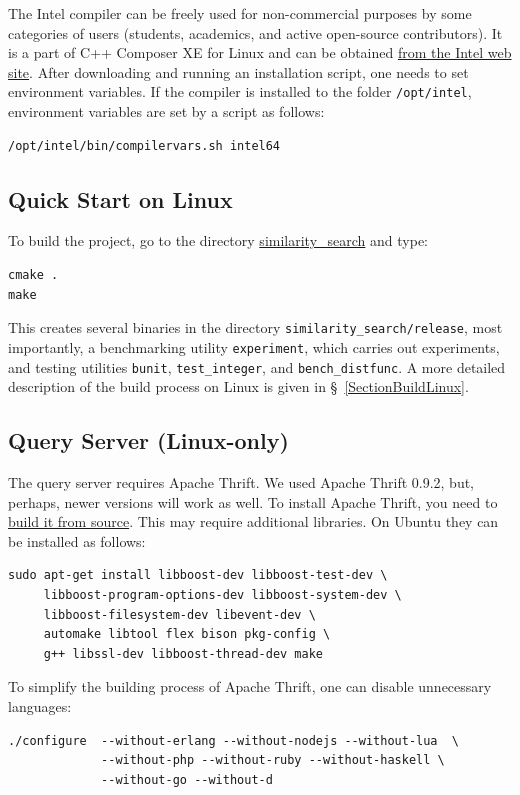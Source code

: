 \documentclass[runningheads,a4paper]{llncs}
\newcommand{\replocdir}{https://github.com/searchivarius/NonMetricSpaceLib/tree/pserv}
\newcommand{\ttt}[1]{\texttt{#1}}
\begin{document}
{The Intel compiler can be freely used for non-commercial purposes by some categories of users (students, academics,
and active open-source contributors).
It is a part of C++ Composer XE for Linux and can 
be obtained \href{http://software.intel.com/en-us/non-commercial-software-development}{from the Intel web site}.
After downloading and running an installation script, one needs to set environment variables.
If the compiler is installed to the folder \ttt{/opt/intel}, environment variables
are set by a script as follows:
\begin{verbatim}
/opt/intel/bin/compilervars.sh intel64
\end{verbatim}



\subsection{Quick Start on Linux}\label{QuickStartLinux}
To build the project, go to the directory \href{\replocdir similarity_search}{similarity\_search} and type:  
\begin{verbatim}
cmake .  
make   
\end{verbatim}
This creates several binaries in the directory \ttt{similarity\_search/release}, 
most importantly, 
a benchmarking utility \ttt{experiment}, which carries out experiments,
and testing utilities \ttt{bunit}, \ttt{test\_integer}, and \ttt{bench\_distfunc}.
A more detailed description of the build process on Linux is given in \S~\ref{SectionBuildLinux}.

\subsection{Query Server (Linux-only)}\label{SectionQueryServer}

The query server requires Apache Thrift. We used Apache Thrift 0.9.2, but, perhaps, newer versions will work as well.  
To install Apache Thrift, you need to \href{https://thrift.apache.org/docs/BuildingFromSource}{build it from source}.
This may require additional libraries. On Ubuntu they can be installed as follows:
\begin{verbatim}
sudo apt-get install libboost-dev libboost-test-dev \ 
     libboost-program-options-dev libboost-system-dev \
     libboost-filesystem-dev libevent-dev \
     automake libtool flex bison pkg-config \
     g++ libssl-dev libboost-thread-dev make
\end{verbatim}
To simplify the building process of Apache Thrift, one can disable unnecessary languages:
\begin{verbatim}
./configure  --without-erlang --without-nodejs --without-lua  \
             --without-php --without-ruby --without-haskell \
             --without-go --without-d 
\end{verbatim}

}
\end{document}
